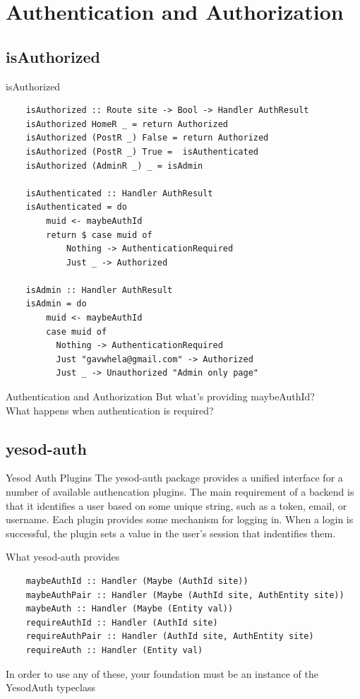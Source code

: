 \documentclass[pdf]{beamer}
\begin{document}
\section{Authentication and Authorization}
\subsection{isAuthorized}
\begin{frame}[fragile]{isAuthorized}
  \begin{verbatim}
    isAuthorized :: Route site -> Bool -> Handler AuthResult
    isAuthorized HomeR _ = return Authorized
    isAuthorized (PostR _) False = return Authorized
    isAuthorized (PostR _) True =  isAuthenticated
    isAuthorized (AdminR _) _ = isAdmin

    isAuthenticated :: Handler AuthResult
    isAuthenticated = do
        muid <- maybeAuthId
        return $ case muid of
            Nothing -> AuthenticationRequired
            Just _ -> Authorized

    isAdmin :: Handler AuthResult
    isAdmin = do
        muid <- maybeAuthId
        case muid of
          Nothing -> AuthenticationRequired
          Just "gavwhela@gmail.com" -> Authorized
          Just _ -> Unauthorized "Admin only page"
  \end{verbatim}
\end{frame}

\begin{frame}{Authentication and Authorization}
  But what's providing maybeAuthId?\\
  What happens when authentication is required?\\
\end{frame}

\subsection{yesod-auth}
\begin{frame}{Yesod Auth Plugins}
  The yesod-auth package provides a unified interface for a number of
  available authencation plugins. The main requirement of a backend is
  that it identifies a user based on some unique string, such as a
  token, email, or username. Each plugin provides some mechanism for
  logging in. When a login is successful, the plugin sets a value in
  the user's session that indentifies them.
\end{frame}

\begin{frame}[fragile]{What yesod-auth provides}
  \begin{verbatim}
    maybeAuthId :: Handler (Maybe (AuthId site))
    maybeAuthPair :: Handler (Maybe (AuthId site, AuthEntity site))
    maybeAuth :: Handler (Maybe (Entity val))
    requireAuthId :: Handler (AuthId site)
    requireAuthPair :: Handler (AuthId site, AuthEntity site)
    requireAuth :: Handler (Entity val)
  \end{verbatim}
  \pause
  In order to use any of these, your foundation must be an instance of
  the YesodAuth typeclass
\end{frame}
\end{document}
